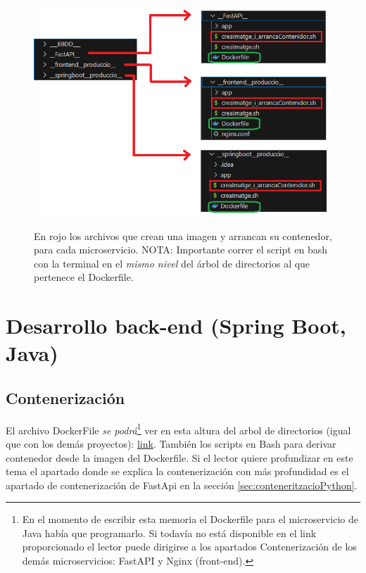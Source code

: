 \documentclass[a4paper,12pt]{report}
\begin{document}
				
				\FloatBarrier
				\setlength{\belowcaptionskip}{3pt}
				\begin{figure}[H]
					\centering
					\caption{En rojo los archivos que crean una imagen y arrancan su contenedor, para cada microservicio. NOTA: Importante correr el script en bash con la terminal en el \textit{mismo nivel} del árbol de directorios al que pertenece el Dockerfile.}
					\includegraphics[width=.7\linewidth]{img/dockeritzacioAplicacioPlantilla.png}
					\label{fig:dockeritzacioAplicacioPlantilla}
				\end{figure}
				\FloatBarrier
				
			

			
			\section{Desarrollo back-end (Spring Boot, Java)}
			\label{sec:parteSpringBoot}
			
				\subsection{Contenerización}
				
				El archivo DockerFile  \textit{se podrá}\footnote{En el momento de escribir esta memoria el Dockerfile para el microservicio de Java había que programarlo. Si todavía no está disponible en el link proporcionado el lector puede dirigirse a los apartados Contenerización de los demás microservicios: FastAPI y Nginx (front-end).} ver en esta altura del arbol de directorios (igual que con los demás proyectos): \href{https://github.com/blackcub3s/mercApp/tree/main/APP%20WEB/__springboot__produccio__}{link}. También los scripts en Bash para derivar contenedor desde la imagen del Dockerfile. Si el lector quiere profundizar en este tema el apartado donde se explica la contenerización con más profundidad es el apartado de contenerización de FastApi en la sección \ref{sec:conteneritzacioPython}.
			
\end{document}
